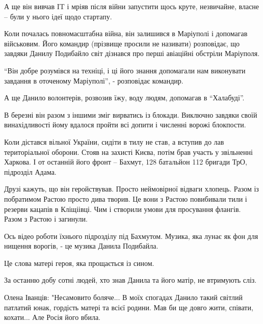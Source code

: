 
А ще він вивчав IT і мріяв після війни запустити щось круте, незвичайне, власне
– були у нього ідеї щодо стартапу.

Коли почалась повномасштабна війна, він залишився в Маріуполі і допомагав
військовим. Його командир (прізвище просили не називати) розповідає, що завдяки
Данилу Подибайло світ дізнався про перші авіаційні обстріли Маріуполя. 

\enquote{Він добре розумівся на техніці, і ці його знання допомагали нам виконувати
завдання в оточеному Маріуполі}, - розповідає командир.


А ще Данило волонтерів, розвозив їжу, воду людям, допомагав в
\enquote{Халабуді}.

В березні він разом з іншими зміг вирватись із блокади. Виключно завдяки своїй
винахідливості йому вдалося пройти всі допити і численні ворожі блокпости.

Коли дістався вільної України, сидіти в тилу не став, а вступив до лав
територіальної оборони. Стояв на захисті Києва, потім брав участь у звільненні
Харкова. І от останній його фронт – Бахмут, 128 батальйон 112 бригади ТрО,
підрозділ Адама. 

Друзі кажуть, що він геройствував. Просто неймовірної відваги хлопець. Разом із
побратимом Растою просто дива творив. Це вони з Растою повибивали тили і
резерви кацапів в Кліщіівці. Чим і створили умови для просування флангів. Разом
з Растою і загинули.

Ось відео роботи їхнього підрозділу під Бахмутом. Музика, яка лунає як фон для
нищення ворогів, - це музика Данила Подибайла.



Це слова матері героя, яка прощається із сином.


За останню добу сотні людей, хто знав Данила та його матір, не втримують сліз.

Олена Іванців: "Несамовито боляче... В моїх спогадах Данило такий світлий
патлатий юнак, гордість матері та всієї родини. Мав би ще довго жити, співати,
кохати... Але Росія його вбила. 

